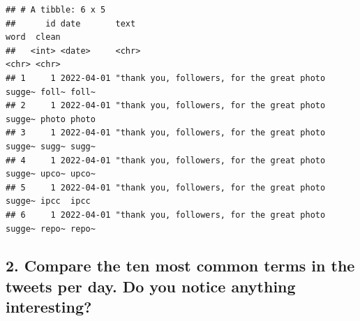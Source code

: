 \documentclass[
]{article}
\newenvironment{Shaded}{\begin{snugshade}}{\end{snugshade}}
\newcommand{\AttributeTok}[1]{\textcolor[rgb]{0.77,0.63,0.00}{#1}}
\newcommand{\CommentTok}[1]{\textcolor[rgb]{0.56,0.35,0.01}{\textit{#1}}}
\newcommand{\FunctionTok}[1]{\textcolor[rgb]{0.00,0.00,0.00}{#1}}
\newcommand{\NormalTok}[1]{#1}
\newcommand{\OtherTok}[1]{\textcolor[rgb]{0.56,0.35,0.01}{#1}}
\newcommand{\SpecialCharTok}[1]{\textcolor[rgb]{0.00,0.00,0.00}{#1}}
\newcommand{\StringTok}[1]{\textcolor[rgb]{0.31,0.60,0.02}{#1}}
\begin{document}
\begin{Shaded}
\end{Shaded}

\begin{verbatim}
## # A tibble: 6 x 5
##      id date       text                                              word  clean
##   <int> <date>     <chr>                                             <chr> <chr>
## 1     1 2022-04-01 "thank you, followers, for the great photo sugge~ foll~ foll~
## 2     1 2022-04-01 "thank you, followers, for the great photo sugge~ photo photo
## 3     1 2022-04-01 "thank you, followers, for the great photo sugge~ sugg~ sugg~
## 4     1 2022-04-01 "thank you, followers, for the great photo sugge~ upco~ upco~
## 5     1 2022-04-01 "thank you, followers, for the great photo sugge~ ipcc  ipcc 
## 6     1 2022-04-01 "thank you, followers, for the great photo sugge~ repo~ repo~
\end{verbatim}

\hypertarget{compare-the-ten-most-common-terms-in-the-tweets-per-day.-do-you-notice-anything-interesting}{%
\subsection{2. Compare the ten most common terms in the tweets per day.
Do you notice anything
interesting?}\label{compare-the-ten-most-common-terms-in-the-tweets-per-day.-do-you-notice-anything-interesting}}
\end{document}
